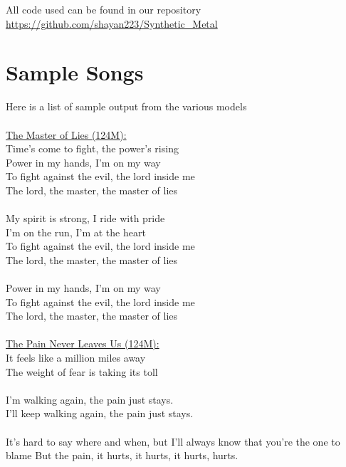 \documentclass[11pt]{article}
\begin{document}
All code used can be found in our repository \href{https://github.com/shayan223/Synthetic_Metal}{https://github.com/shayan223/Synthetic\_Metal}


\section{Sample Songs}

Here is a list of sample output from the various models\\\\
\parindent=0pt
\underline{The Master of Lies (124M):}\\
Time's come to fight, the power's rising\\
Power in my hands, I'm on my way\\
To fight against the evil, the lord inside me\\
The lord, the master, the master of lies\\
\\
My spirit is strong, I ride with pride\\
I'm on the run, I'm at the heart\\
To fight against the evil, the lord inside me\\
The lord, the master, the master of lies\\
\\
Power in my hands, I'm on my way\\
To fight against the evil, the lord inside me\\
The lord, the master, the master of lies\\
\\
\underline{The Pain Never Leaves Us (124M):}\\
It feels like a million miles away\\
The weight of fear is taking its toll\\
\\
I'm walking again, the pain just stays.\\
I'll keep walking again, the pain just stays.\\
\\
It's hard to say where and when, but I'll always know that you're the one to blame
But the pain, it hurts, it hurts, it hurts, hurts.\\
\end{document}
